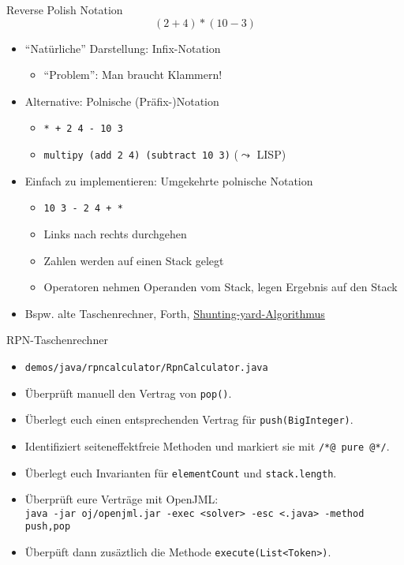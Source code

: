 \documentclass{beamer}
\begin{document}
\begin{frame}{Reverse Polish Notation}
	\begin{equation*}
		(2 + 4) * (10 - 3)
	\end{equation*}

	\begin{itemize}
		\item \enquote{Natürliche} Darstellung: Infix-Notation
		\begin{itemize}
			\item \enquote{Problem}: Man braucht Klammern!
		\end{itemize}
		\pause
		\item Alternative: Polnische (Präfix-)Notation
		\begin{itemize}
			\item \texttt{* + 2 4 - 10 3}
			\item \texttt{multipy (add 2 4) (subtract 10 3)} ($\leadsto$ LISP)
		\end{itemize}
		\pause
		\item Einfach zu implementieren: Umgekehrte polnische Notation
		\begin{itemize}
			\item \texttt{10 3 - 2 4 + *}
			\item Links nach rechts durchgehen
			\item Zahlen werden auf einen Stack gelegt
			\item Operatoren nehmen Operanden vom Stack, legen Ergebnis auf den Stack
		\end{itemize}
		\pause
		\item Bspw. alte Taschenrechner, Forth, \href{https://de.wikipedia.org/wiki/Shunting-yard-Algorithmus}{Shunting-yard-Algorithmus}
	\end{itemize}
\end{frame}

\begin{frame}{RPN-Taschenrechner}
	\begin{itemize}
		\item \texttt{demos/java/rpncalculator/RpnCalculator.java}
		\item Überprüft manuell den Vertrag von \texttt{pop()}.
		\pause
		\item Überlegt euch einen entsprechenden Vertrag für \texttt{push(BigInteger)}.
		\pause
		\item Identifiziert seiteneffektfreie Methoden und markiert sie mit \texttt{/*@ pure @*/}.
		\pause
		\item Überlegt euch Invarianten für \texttt{elementCount} und \texttt{stack.length}.
		\pause
		\item Überprüft eure Verträge mit OpenJML:\\
			{\footnotesize \texttt{java -jar oj/openjml.jar -exec <solver> -esc <.java> -method push,pop}}
		\item Überpüft dann zusäztlich die Methode \texttt{execute(List<Token>)}.
	\end{itemize}
\end{frame}
\end{document}
